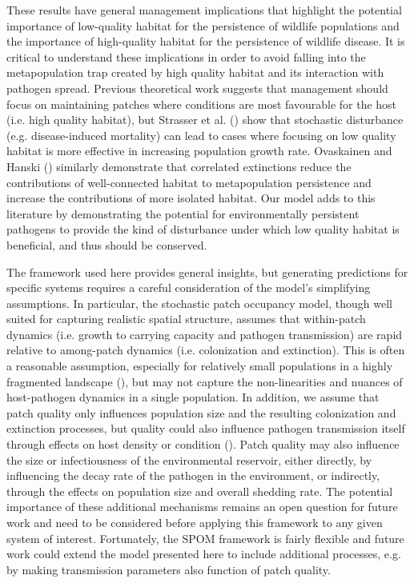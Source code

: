 \documentclass{article}
\begin{document}
These results have general management implications that highlight the potential importance of low-quality habitat for the persistence of wildlife populations and the importance of high-quality habitat for the persistence of wildlife disease.
It is critical to understand these implications in order to avoid falling into the metapopulation trap created by high quality habitat and its interaction with pathogen spread.
Previous theoretical work suggests that management should focus on maintaining patches where conditions are most favourable for the host (i.e. high quality habitat), but Strasser et al. (\cite{Strasser2010}) show that stochastic disturbance (e.g. disease-induced mortality) can lead to cases where focusing on low quality habitat is more effective in increasing population growth rate.
Ovaskainen and Hanski (\cite{Ovaskainen2003a}) similarly demonstrate that correlated extinctions reduce the contributions of well-connected habitat to metapopulation persistence and increase the contributions of more isolated habitat.
Our model adds to this literature by demonstrating the potential for environmentally persistent pathogens to provide the kind of disturbance under which low quality habitat is beneficial, and thus should be conserved.

The framework used here provides general insights, but generating predictions for specific systems requires a careful consideration of the model's simplifying assumptions.
In particular, the stochastic patch occupancy model, though well suited for capturing realistic spatial structure, assumes that within-patch dynamics (i.e. growth to carrying capacity and pathogen transmission) are rapid relative to among-patch dynamics (i.e. colonization and extinction).
This is often a reasonable assumption, especially for relatively small populations in a highly fragmented landscape (\cite{Hanski2003}), but may not capture the non-linearities and nuances of host-pathogen dynamics in a single population.
In addition, we assume that patch quality only influences population size and the resulting colonization and extinction processes, but quality could also influence pathogen transmission itself through effects on host density or condition (\cite{Becker2015}).
Patch quality may also influence the size or infectiousness of the environmental reservoir, either directly, by influencing the decay rate of the pathogen in the environment, or indirectly, through the effects on population size and overall shedding rate.
The potential importance of these additional mechanisms remains an open question for future work and need to be considered before applying this framework to any given system of interest.
Fortunately, the SPOM framework is fairly flexible and future work could extend the model presented here to include additional processes, e.g. by making transmission parameters also function of patch quality.
\end{document}
